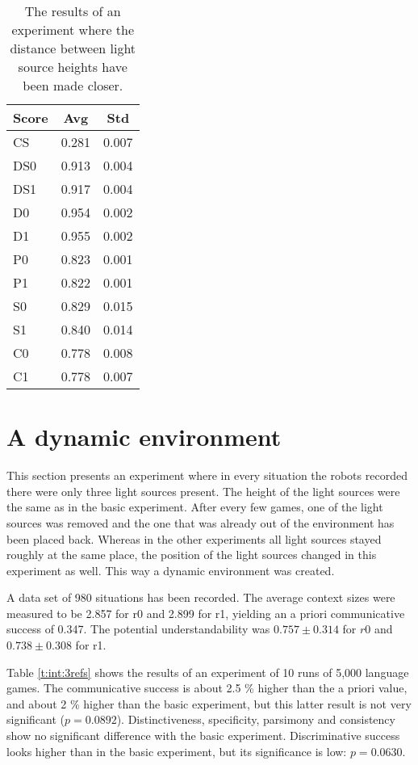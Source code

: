 \begin{table}
\centering
\begin{tabular}{||l|c|c||}
\hline\hline
Score & Avg & Std\\\hline
CS & 0.281 & 0.007\\\hline
DS0 & 0.913 & 0.004\\\hline
DS1 & 0.917 & 0.004\\\hline
D0 & 0.954 & 0.002\\\hline
D1 & 0.955 & 0.002\\\hline
P0 & 0.823 & 0.001\\\hline
P1 & 0.822 & 0.001\\\hline
S0 & 0.829 & 0.015\\\hline
S1 & 0.840 & 0.014\\\hline
C0 & 0.778 & 0.008\\\hline
C1 & 0.778 & 0.007\\\hline
\hline
\end{tabular}
\caption{The results of an experiment where the distance between light source heights have been made closer.}
\label{t:int:close}
\end{table}

\section{A dynamic environment}\label{s:int:3refs}

This section presents an experiment where in every situation the robots recorded there were only three light sources present. The height of the light sources were the same as in the basic experiment. After every few games, one of the light sources was removed and the one that was already out of the environment has been placed back. Whereas in the other experiments all light sources stayed roughly at the same place, the position of the light sources changed in this experiment as well. This way a dynamic environment was created.

A data set of 980 situations has been recorded. The average context sizes were measured to be 2.857 for r0 and 2.899 for r1, yielding an a priori communicative success of 0.347. The potential understandability was $0.757 \pm 0.314$ for $r0$ and $0.738 \pm 0.308$ for r1. 

Table \ref{t:int:3refs} shows the results of an experiment of 10 runs of 5,000 language games. The communicative success is about 2.5 \% higher than the a priori value, and about 2 \% higher than the basic experiment, but this latter result is not very significant ($p=0.0892$). Distinctiveness, specificity, parsimony and consistency show no significant difference with the basic experiment. Discriminative success looks higher than in the basic experiment, but its significance is low: $p=0.0630$.

